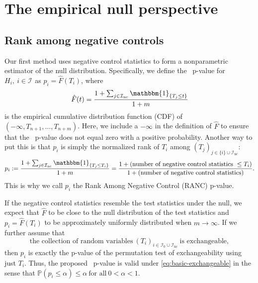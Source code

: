 \documentclass[a4paper,11pt]{article}
\theoremstyle{plain}
\theoremstyle{definition}
\def\PP{\mathbb{P}}
\def\calI{\mathcal{I}}
\def\1{\mathbbm{1}}
\theoremstyle{plain}
\newcommand{\No}{{n}}
\newcommand{\NoNc}{m}
\newcommand{\pval}[1]{{p_{#1}}}
\newcommand{\testStatistics}[1]{{T_{#1}}}
\newcommand{\nickname}{{\text{RANC}}}
\newcommand{\hypothesis}[1]{{H_{#1}}}
\newcommand{\hypothesisIndex}[1]{{\calI_{#1}}}
\begin{document}
\section{The empirical null perspective}\label{sec:pval}

\subsection{Rank among negative controls}
\label{sec:ranc-p-values}

Our first method uses negative control statistics to form a
nonparametric estimator of the null distribution. Specifically, we
define the \nickname~p-value for $\hypothesis{i},~i \in
\hypothesisIndex{}$ as $\pval{i} = \hat{F}(\testStatistics{i})$, where
\begin{align}\label{defi:nc.ecdf.2}
  \hat{F}(t)
  = \frac{1 + \sum_{j \in \hypothesisIndex{\text{nc}}}
  \1_{\{\testStatistics{j} \le
  t\}}}{1 + \NoNc}
\end{align}
is the empirical cumulative distribution function (CDF) of
$(-\infty,\testStatistics{\No+1},\dotsc,\testStatistics{\No+\NoNc})$.
Here, we include a $-\infty$ in the definition of
$\hat{F}$ to ensure that the \nickname~p-value does not equal zero with
a positive probability.
Another way to put this is that $\pval{i}$ is simply the
normalized rank of $\testStatistics{i}$ among
$(\testStatistics{j})_{j \in \{i\} \cup \hypothesisIndex{\text{nc}}}$:
\begin{align}\label{eq:pval}
  \pval{i} := \frac{1 + \sum_{j \in \hypothesisIndex{\text{nc}}}
  \1_{\{\testStatistics{j} \le \testStatistics{i}\}}}{1 + \NoNc} =
  \frac{1 + (\text{number of negative control statistics
  }\leq T_i)}{1 + (\text{number of negative control statistics})}.
\end{align}
This is why we call $\pval{i}$ the Rank Among
Negative Control (RANC) p-value.

If the negative control statistics resemble the test statistics under
the null, we expect that $\hat{F}$ to be close to the null distribution
of the test statistics and $\pval{i} = \hat{F}(\testStatistics{i})$ to
be approximately uniformly distributed when $\NoNc \to \infty$. If we
further assume that
\begin{equation}
  \label{eq:basic-exchangeable}
  \text{the collection of random variables}~(\testStatistics{i})_{i\in
    \hypothesisIndex{0} \cup \hypothesisIndex{\text{nc}}} ~\text{is
    exchangeable},
\end{equation}
then $\pval{i}$ is exactly the p-value of the permutation test of
exchangeability using just $T_i$. Thus, the proposed \nickname~p-value
is valid under \eqref{eq:basic-exchangeable} in the sense
that $\PP(\pval{i} \leq \alpha) \leq \alpha~\text{for all}~0 < \alpha
< 1$.
\end{document}
